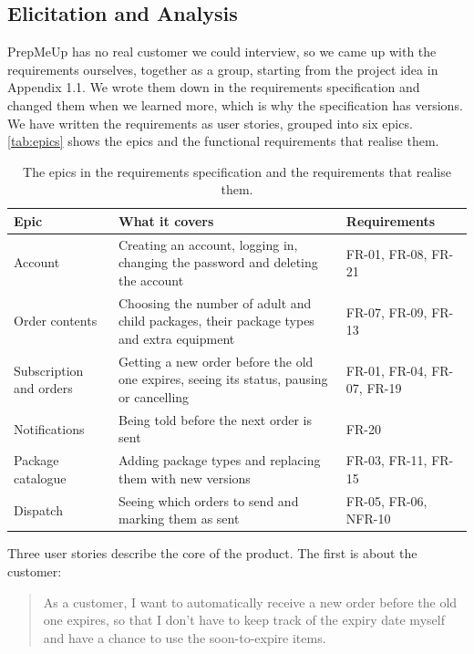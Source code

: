 \subsection{Elicitation and Analysis}\label{sec:req-stories}

PrepMeUp has no real customer we could interview, so we came up with the requirements
ourselves, together as a group, starting from the project idea in Appendix 1.1. We
wrote them down in the requirements specification and changed them when we learned
more, which is why the specification has versions. We have written the requirements as user stories, grouped into six epics.
\autoref{tab:epics} shows the epics and the functional requirements that realise them.

\begin{table}[H]
    \centering
    \begin{tabular}{@{}l p{5.6cm} l@{}}
        \hline
        Epic & What it covers & Requirements \\
        \hline
        Account & Creating an account, logging in, changing the password and deleting the account & FR-01, FR-08, FR-21 \\
        Order contents & Choosing the number of adult and child packages, their package types and extra equipment & FR-07, FR-09, FR-13 \\
        Subscription and orders & Getting a new order before the old one expires, seeing its status, pausing or cancelling & FR-01, FR-04, FR-07, FR-19 \\
        Notifications & Being told before the next order is sent & FR-20 \\
        Package catalogue & Adding package types and replacing them with new versions & FR-03, FR-11, FR-15 \\
        Dispatch & Seeing which orders to send and marking them as sent & FR-05, FR-06, NFR-10 \\
        \hline
    \end{tabular}
    \caption{The epics in the requirements specification and the requirements that realise them.}
    \label{tab:epics}
\end{table}

Three user stories describe the core of the product. The first is about the customer:

\begin{quote}
As a customer, I want to automatically receive a new order before the old one expires,
so that I don't have to keep track of the expiry date myself and have a chance to use
the soon-to-expire items.
\end{quote}

